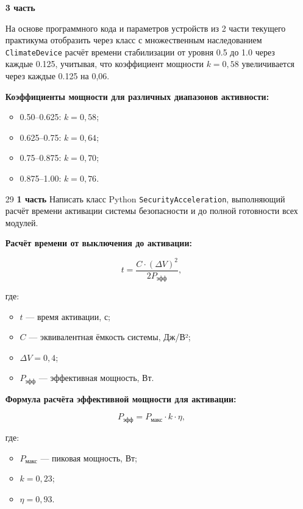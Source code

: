 \begin{enumerate}
\textbf{3 часть}

На основе программного кода и параметров устройств из 2 части текущего практикума отобразить через класс с множественным наследованием \texttt{ClimateDevice} расчёт времени стабилизации от уровня 0.5 до 1.0 через каждые 0.125, учитывая, что коэффициент мощности $k = 0{,}58$ увеличивается через каждые 0.125 на 0{,}06.

\textbf{Коэффициенты мощности для различных диапазонов активности:}
\begin{itemize}
    \item 0.50–0.625: $k = 0{,}58$;  
    \item 0.625–0.75: $k = 0{,}64$;  
    \item 0.75–0.875: $k = 0{,}70$;  
    \item 0.875–1.00: $k = 0{,}76$.  
\end{itemize}


\item[29] \textbf{1 часть}  
Написать класс Python \texttt{SecurityAcceleration}, выполняющий расчёт времени активации системы безопасности и до полной готовности всех модулей.

\textbf{Расчёт времени от выключения до активации:}

\begin{equation}
t = \frac{C \cdot (\Delta V)^2}{2P_{\text{эфф}}},
\end{equation}

где:  
\begin{itemize}
    \item $t$ — время активации, с;  
    \item $C$ — эквивалентная ёмкость системы, Дж/В²;  
    \item $\Delta V = 0{,}4$;  
    \item $P_{\text{эфф}}$ — эффективная мощность, Вт.  
\end{itemize}

\textbf{Формула расчёта эффективной мощности для активации:}

\begin{equation}
P_{\text{эфф}} = P_{\text{макс}} \cdot k \cdot \eta,
\end{equation}

где:  
\begin{itemize}
    \item $P_{\text{макс}}$ — пиковая мощность, Вт;  
    \item $k = 0{,}23$;  
    \item $\eta = 0{,}93$.  
\end{itemize}


\end{enumerate}
